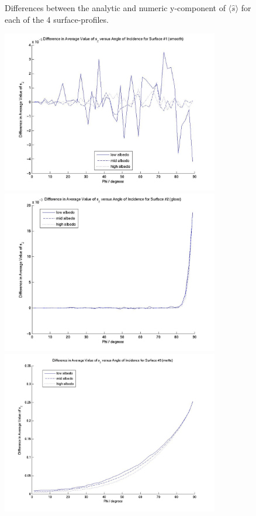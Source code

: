 \begin{description}
\begin{figure}[!ht]
        \caption{Differences between the analytic and numeric y-component of
                 $\langle \hat{s}\rangle$ for each of the 4
                 surface-profiles.}
        \label{fig:ivv_sda_s_vector_diffs_y}
      \end{figure}

      \begin{figure}[!ht]
        \includegraphics[width=95mm]{figs/sda/unit_vec_diff__z_smooth.jpg}
        \includegraphics[width=95mm]{figs/sda/unit_vec_diff__z__gloss.jpg}
        \includegraphics[width=95mm]{figs/sda/unit_vec_diff__z__matte.jpg}

\end{figure}
\end{description}
